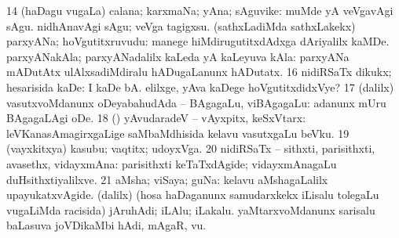 \num{14} (haDagu \mo vugaLa) calana; karxmaNa; yAna; sAguvike:  muMde yA veVgavAgi sAgu.  nidhAnavAgi sAgu; veVga tagigxsu. 
\banum
{} (sathxLadiMda sathxLakekx) parxyANa; hoVgutitxruvudu:  manege hiMdirugutitxdAdxga dAriyalilx kaMDe. 
 parxyANakAla; parxyANadalilx kaLeda yA kaLeyuva kAla:  parxyANa mADutAtx ulAlxsadiMdiralu hADugaLanunx hADutatx. 
\eanum
\numie
\num{16} nidiRSaTx dikukx; hesarisida kaDe:  I kaDe bA.  elilxge, yAva kaDege hoVgutitxdidxVye? 
\num{17} (\bava dalilx) vasutxvoMdanunx oDeyabahudAda -- BAgagaLu, viBAgagaLu:  adanunx mUru BAgagaLAgi oDe. 
\num{18} (\AmA) yAvudaradeV -- vAyxpitx, keSxVtarx:  leVKanasAmagirxgaLige saMbaMdhisida kelavu vasutxgaLu beVku. 
\num{19} (vayxkitxya) kasubu; vaqtitx; udoyxVga. 
\num{20} nidiRSaTx -- sithxti, parisithxti, avasethx, vidayxmAna:  parisithxti keTaTxdAgide; vidayxmAnagaLu duHsithxtiyalilxve. 
\num{21} aMsha; viSaya; guNa:  kelavu aMshagaLalilx upayukatxvAgide. 
 (\bava dalilx) 
\banum
{} (hosa haDaganunx samudarxkekx iLisalu tolegaLu \mo vugaLiMda racisida) jAruhAdi; iLAlu; iLakalu. 
 yaMtarxvoMdanunx sarisalu baLasuva joVDikaMbi hAdi, mAgaR, \mo vu. 
\eanum
\numie
\enum
\emng

